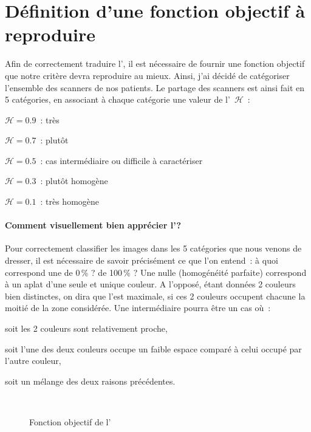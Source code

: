 \documentclass[main.tex]{subfiles}
\begin{document}

\section{Définition d'une fonction objectif à reproduire}
Afin de correctement traduire l'\hetero, il est nécessaire de fournir une fonction objectif que notre critère devra reproduire au mieux. Ainsi, j'ai décidé de catégoriser l'ensemble des scanners de nos patients. Le partage des scanners est ainsi fait en 5 catégories, en associant à chaque catégorie une valeur de l'\hetero~$\mathscr{H}$~:
\begin{myitemize}
\item $\mathscr{H}=0.9$~: très \heterogene
\item $\mathscr{H}=0.7$~: plutôt \heterogene
\item $\mathscr{H}=0.5$~: cas intermédiaire ou difficile à caractériser
\item $\mathscr{H}=0.3$~: plutôt homogène
\item $\mathscr{H}=0.1$~: très homogène
\end{myitemize}

\paragraph{Comment visuellement bien apprécier l'\hetero ?}
Pour correctement classifier les images dans les 5 catégories que nous venons de dresser, il est nécessaire de savoir précisément ce que l'on entend~: à quoi correspond une \hetero de 0\,\% ? de 100\,\% ? Une \hetero nulle (\ie homogénéité parfaite) correspond à un aplat d'une seule et unique couleur. A l'opposé, étant données 2 couleurs bien distinctes, on dira que l'\hetero est maximale, si  ces 2 couleurs occupent chacune la moitié de la zone considérée. Une \hetero intermédiaire pourra être un cas où~:
\begin{myitemize}
\item soit les 2 couleurs sont relativement proche,
\item soit l'une des deux couleurs occupe un faible espace comparé à celui occupé par l'autre couleur, 
\item soit un mélange des deux raisons précédentes.
\end{myitemize}~
\begin{figure}
\caption{\label{fig:hetero_visuelle}Fonction objectif de l'\hetero}
\end{figure}
\end{document}
